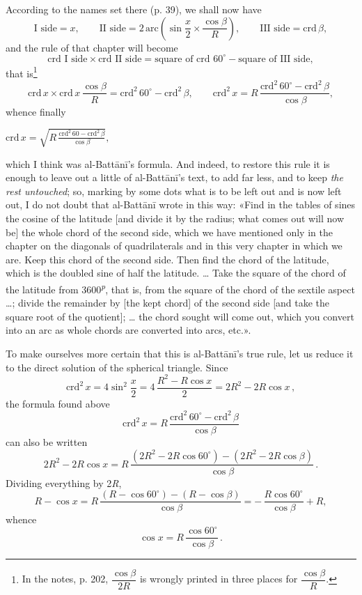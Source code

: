 \documentclass[11pt]{article}
\newcommand{\Pg}[1]{\marginpar{\footnotesize\color{gray}#1}}
\begin{document}
\par According to the names set there (p. 39), we shall now have \[ \text{I side} = x,\qquad \text{II side} = 2\,\text{arc}\left(\sin\frac{x}{2}\times\frac{\cos\beta}{R}\right),\qquad \text{III side} = \text{crd}\,\beta, \] and the rule of that chapter will become \[ \text{crd I side}\times\text{crd II side} = \text{square of crd } 60^\circ - \text{square of III side}, \] that is\footnote{In the notes, p. 202, $\dfrac{\cos\beta}{2R}$ is wrongly printed in three places for $\dfrac{\cos\beta}{R}$.} \[ \text{crd}\,x\times\text{crd}\,x\,\frac{\cos\beta}{R} = \text{crd}^2\,60^\circ - \text{crd}^2\,\beta,\qquad \text{crd}^2\,x = R\,\frac{\text{crd}^2\,60^\circ - \text{crd}^2\,\beta}{\cos\beta}, \] whence finally \par\noindent\hspace*{1.5em}$\displaystyle \text{crd}\,x = \sqrt{R\,\frac{\text{crd}^2\,60 - \text{crd}^2\,\beta}{\cos\beta}},$\par which I think was al-Battānī's formula. And indeed, to restore this rule it is enough to leave out a little of al-Battānī's text, to add far less, and to keep \emph{the rest untouched}; so, marking by some dots what is to be left out and is now left out, I do not doubt that al-Battānī wrote in this way: «Find in the tables of sines the cosine of the latitude [and divide it by the radius; what comes out will now be] the whole chord of the second side, which we have mentioned only in the chapter on the diagonals of quadrilaterals and in this very chapter in which we are. Keep this chord of the second side. Then find the chord of the latitude, which is the doubled sine of half the latitude. … Take the square of the chord of the latitude from 3600\textsuperscript{\itshape p}, that is, from the square of the chord of the sextile aspect …; divide the remainder by [the kept chord] of the second side [and take the square root of the quotient]; … the chord sought will come out, which you convert into an arc as whole chords are converted into arcs, etc.».\par
\par \Pg{I 308}To make ourselves more certain that this is al-Battānī's true rule, let us reduce it to the direct solution of the spherical triangle. Since \[ \text{crd}^2\,x = 4\sin^2\frac{x}{2} = 4\,\frac{R^2 - R\cos x}{2} = 2R^2 - 2R\cos x\,, \] the formula found above \[ \text{crd}^2\,x = R\,\frac{\text{crd}^2\,60^\circ - \text{crd}^2\,\beta}{\cos\beta} \] can also be written \[ 2R^2 - 2R\cos x = R\,\frac{(2R^2 - 2R\cos 60^\circ) - (2R^2 - 2R\cos\beta)}{\cos\beta}\,. \] Dividing everything by 2\emph{R}, \[ R - \cos x = R\,\frac{(R - \cos 60^\circ) - (R - \cos\beta)}{\cos\beta} = -\,\frac{R\cos 60^\circ}{\cos\beta} + R, \] whence \[ \cos x = R\,\frac{\cos 60^\circ}{\cos\beta}\,. \]\par
\end{document}
